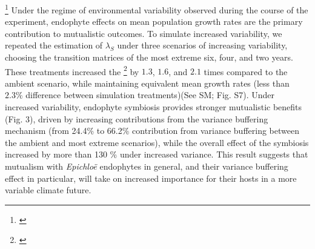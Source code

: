 \documentclass[12pt]{article}
\newcommand{\tom}[2]{{\color{red}{#1}}\footnote{\textit{\color{red}{#2}}}}
\begin{document}
\tom{We next used simulations to assess how contributions from mean effects and variance buffering change under increased variability, a key prediction of climate change.}{This will flow better if it follows the description of ``all years'' results. We might also think about just showing 2 and 6 extreme years, which would simplify this figure.}
Under the regime of environmental variability observed during the course of the experiment, endophyte effects on mean population growth rates are the primary contribution to mutualistic outcomes.
To simulate increased variability, we repeated the estimation of $\lambda_{S}$ under three scenarios of increasing variability, choosing the transition matrices of the most extreme six, four, and two years. 
These treatments increased the \tom{standard deviation}{of what?} by $1.3$, $1.6$, and $2.1$ times compared to the ambient scenario, while maintaining equivalent mean growth rates (less than $2.3\%$ difference between simulation treatments)(See SM; Fig. S7).
Under increased variability, endophyte symbiosis provides stronger mutualistic benefits (Fig. 3), driven by increasing contributions from the variance buffering mechanism (from 24.4\% to 66.2\% contribution from variance buffering between the ambient and most extreme scenarios), while the overall effect of the symbiosis increased by more than 130 \% under increased variance.
This result suggests that mutualism with \emph{Epichlo\"{e}} endophytes in general, and their variance buffering effect in particular, will take on increased importance for their hosts in a more variable climate future.
\end{document}
